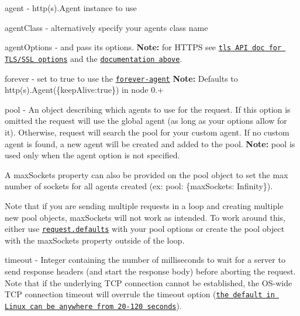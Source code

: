 \begin{DoxyItemize}
\item {\ttfamily agent} -\/ {\ttfamily http(s).Agent} instance to use
\item {\ttfamily agent\+Class} -\/ alternatively specify your agent\textquotesingle{}s class name
\item {\ttfamily agent\+Options} -\/ and pass its options. {\bfseries Note\+:} for H\+T\+T\+PS see \href{http://nodejs.org/api/tls.html#tls_tls_connect_options_callback}{\tt tls A\+PI doc for T\+L\+S/\+S\+SL options} and the \href{#using-optionsagentoptions}{\tt documentation above}.
\item {\ttfamily forever} -\/ set to {\ttfamily true} to use the \href{https://github.com/request/forever-agent}{\tt forever-\/agent} {\bfseries Note\+:} Defaults to {\ttfamily http(s).Agent(\{keep\+Alive\+:true\})} in node 0.+
\item {\ttfamily pool} -\/ An object describing which agents to use for the request. If this option is omitted the request will use the global agent (as long as your options allow for it). Otherwise, request will search the pool for your custom agent. If no custom agent is found, a new agent will be created and added to the pool. {\bfseries Note\+:} {\ttfamily pool} is used only when the {\ttfamily agent} option is not specified.
\begin{DoxyItemize}
\item A {\ttfamily max\+Sockets} property can also be provided on the {\ttfamily pool} object to set the max number of sockets for all agents created (ex\+: {\ttfamily pool\+: \{max\+Sockets\+: Infinity\}}).
\item Note that if you are sending multiple requests in a loop and creating multiple new {\ttfamily pool} objects, {\ttfamily max\+Sockets} will not work as intended. To work around this, either use \href{#requestdefaultsoptions}{\tt {\ttfamily request.\+defaults}} with your pool options or create the pool object with the {\ttfamily max\+Sockets} property outside of the loop.
\end{DoxyItemize}
\item {\ttfamily timeout} -\/ Integer containing the number of milliseconds to wait for a server to send response headers (and start the response body) before aborting the request. Note that if the underlying T\+CP connection cannot be established, the O\+S-\/wide T\+CP connection timeout will overrule the {\ttfamily timeout} option (\href{http://www.sekuda.com/overriding_the_default_linux_kernel_20_second_tcp_socket_connect_timeout}{\tt the default in Linux can be anywhere from 20-\/120 seconds}).
\end{DoxyItemize}






